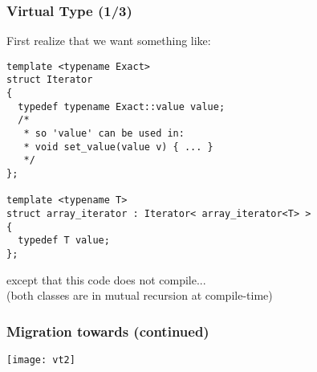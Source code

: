 \begin{frame}[fragile]
  \frametitle{\scoop Virtual Type (1/3)}

  First realize that we want something like:

\medskip

\hspace*{0.1\textwidth}
\begin{minipage}{0.8\textwidth}
\begin{lstlisting}[basicstyle={\tiny\sffamily}]
template <typename Exact>
struct Iterator
{
  typedef typename Exact::value value;
  /*
   * so 'value' can be used in:
   * void set_value(value v) { ... }
   */
};

template <typename T>
struct array_iterator : Iterator< array_iterator<T> >
{
  typedef T value;
};
\end{lstlisting}
\end{minipage}

\medskip

except that this code does not compile...\\
{\small (both classes are in mutual recursion at compile-time)}
\end{frame}




\begin{frame}
  \frametitle{Migration towards \scoop (continued)}

\hspace*{-5mm}
\texttt{[image: vt2]}

\end{frame}





